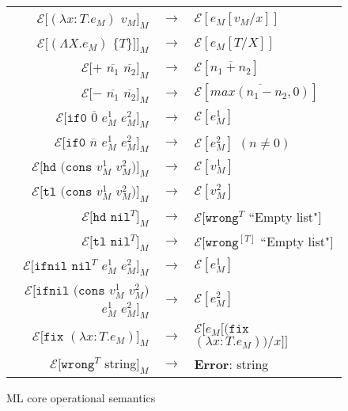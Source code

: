 \begin{figure}[p]
\centering
\begin{tabular}{rcl}
$\mathscr{E}[(\lambda x:T.e_{M})$ $v_{M}]_{M}$ & $\rightarrow$ & $\mathscr{E}[e_{M}[v_{M}/x]]$ \\
$\mathscr{E}[(\Lambda X.e_{M})$ $\lbrace T\rbrace]]_{M}$ & $\rightarrow$ & $\mathscr{E}[e_{M}[T/X]]$ \\
$\mathscr{E}[+$ $\overline{n_{1}}$ $\overline{n_{2}}]_{M}$ & $\rightarrow$ & $\mathscr{E}[\overline{n_{1}+n_{2}}]$ \\
$\mathscr{E}[-$ $\overline{n_{1}}$ $\overline{n_{2}}]_{M}$ & $\rightarrow$ & $\mathscr{E}[\overline{max(n_{1}-n_{2},0)}]$ \\
$\mathscr{E}[\mathtt{if0}$ $\overline{0}$ $e_{M}^{1}$ $e_{M}^{2}]_{M}$ & $\rightarrow$ & $\mathscr{E}[e_{M}^{1}]$ \\
$\mathscr{E}[\mathtt{if0}$ $\overline{n}$ $e_{M}^{1}$ $e_{M}^{2}]_{M}$ & $\rightarrow$ & $\mathscr{E}[e_{M}^{2}]$ $(n\neq0)$ \\
$\mathscr{E}[\mathtt{hd}$ $(\mathtt{cons}$ $v_{M}^{1}$ $v_{M}^{2})]_{M}$ & $\rightarrow$ & $\mathscr{E}[v_{M}^{1}]$ \\
$\mathscr{E}[\mathtt{tl}$ $(\mathtt{cons}$ $v_{M}^{1}$ $v_{M}^{2})]_{M}$ & $\rightarrow$ & $\mathscr{E}[v_{M}^{2}]$ \\
$\mathscr{E}[\mathtt{hd}$ $\mathtt{nil}^{T}]_{M}$ & $\rightarrow$ & $\mathscr{E}[\mathtt{wrong}^{T}$ ``Empty list"$]$ \\
$\mathscr{E}[\mathtt{tl}$ $\mathtt{nil}^{T}]_{M}$ & $\rightarrow$ & $\mathscr{E}[\mathtt{wrong}^{[T]}$ ``Empty list"$]$ \\
$\mathscr{E}[\mathtt{ifnil}$ $\mathtt{nil}^{T}$ $e_{M}^{1}$ $e_{M}^{2}]_{M}$ & $\rightarrow$ & $\mathscr{E}[e_{M}^{1}]$ \\
$\mathscr{E}[\mathtt{ifnil}$ $(\mathtt{cons}$ $v_{M}^{1}$ $v_{M}^{2})$ $e_{M}^{1}$ $e_{M}^{2}]_{M}$ & $\rightarrow$ & $\mathscr{E}[e_{M}^{2}]$ \\
$\mathscr{E}[\mathtt{fix}$ $(\lambda x:T.e_{M})]_{M}$ & $\rightarrow$ & $\mathscr{E}[e_{M}[(\mathtt{fix}$ $(\lambda x:T.e_{M}))/x]]$ \\
$\mathscr{E}[\mathtt{wrong}^{T}$ string$]_{M}$ & $\rightarrow$ & \textbf{Error}: string 
\end{tabular}
\caption{ML core operational semantics}
\label{mcos}
\end{figure}